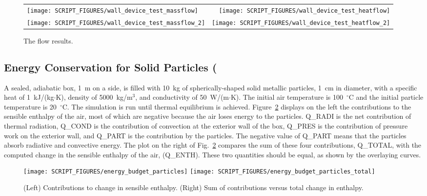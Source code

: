 \documentclass[11pt]{book}
\begin{document}
\begin{figure}[!ht]
\begin{tabular*}{\textwidth}{lr}
\texttt{[image: SCRIPT\_FIGURES/wall\_device\_test\_massflow]} &
\texttt{[image: SCRIPT\_FIGURES/wall\_device\_test\_heatflow]} \\
\texttt{[image: SCRIPT\_FIGURES/wall\_device\_test\_massflow\_2]} &
\texttt{[image: SCRIPT\_FIGURES/wall\_device\_test\_heatflow\_2]}
\end{tabular*}
\caption[The  results]{The  flow results.}
\label{mass_heat_wall_device_flow}
\end{figure}


\FloatBarrier

\subsection{Energy Conservation for Solid Particles (\texorpdfstring{})}
\label{energy_budget_particles}

A sealed, adiabatic box, 1~m on a side, is filled with 10~kg of spherically-shaped solid metallic particles, 1~cm in diameter, with a specific heat of 1~kJ/(kg$\cdot$K), density of 5000~kg/m$^3$, and conductivity of 50~W/(m$\cdot$K). The initial air temperature is 100~$^\circ$C and the initial particle temperature is 20~$^\circ$C. The simulation is run until thermal equilibrium is achieved. Figure~\ref{energy_budget_particles_figs} displays on the left the contributions to the sensible enthalpy of the air, most of which are negative because the air loses energy to the particles. {\ct Q\_RADI} is the net contribution of thermal radiation, {\ct Q\_COND} is the contribution of convection at the exterior wall of the box, {\ct Q\_PRES} is the contribution of pressure work on the exterior wall, and {\ct Q\_PART} is the contribution by the particles. The negative value of {\ct Q\_PART} means that the particles absorb radiative and convective energy. The plot on the right of Fig.~\ref{energy_budget_particles_figs} compares the sum of these four contributions, {\ct Q\_TOTAL}, with the computed change in the sensible enthalpy of the air, ({\ct Q\_ENTH}). These two quantities should be equal, as shown by the overlaying curves.

\begin{figure}[ht]
\texttt{[image: SCRIPT\_FIGURES/energy\_budget\_particles]}
\texttt{[image: SCRIPT\_FIGURES/energy\_budget\_particles\_total]}
\caption[The  test case]{(Left) Contributions to change in sensible enthalpy. (Right) Sum of contributions versus total change in enthalpy.}
\label{energy_budget_particles_figs}
\end{figure}
\end{document}
